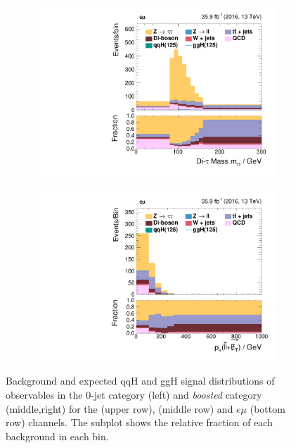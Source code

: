 \begin{figure}[h!]
\begin{subfigure}{.3\textwidth}
    \end{subfigure}%
    \begin{subfigure}{.3\textwidth}
        \centering
        \includegraphics[width=\textwidth]{Figures/eventselection/em/BoostedCP/m_sv.pdf}
    \end{subfigure}%
    \begin{subfigure}{.3\textwidth}
        \centering
        \includegraphics[width=\textwidth]{Figures/eventselection/em/BoostedCP/H_pt.pdf}
    \end{subfigure}
    \caption{Background and expected qqH and ggH signal distributions of observables in the 0-jet category (left) and \textit{boosted} category (middle,right) for the \mutau{} (upper row), \etau{} (middle row) and $e\mu$ (bottom row) channels. 
    The subplot shows the relative fraction of each background in each bin. }\label{SUPPLEMENT:ES:controlplots:0jet_boosted}  
\end{figure}%
\clearpage
